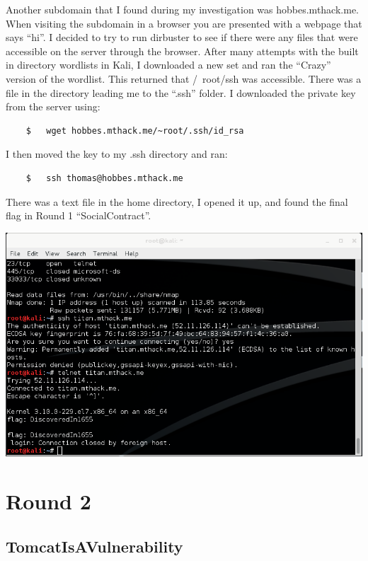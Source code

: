 \documentclass[12pt]{report}
\newcommand{\mychapter}[2]{
    \setcounter{chapter}{#1}
    \setcounter{section}{0}
    \chapter*{#2}
    \addcontentsline{toc}{chapter}{#2}
}
\begin{document}
Another subdomain that I found during my investigation was hobbes.mthack.me. When visiting the subdomain in a browser you are presented with a webpage that says ``hi''. I decided to try to run dirbuster to see if there were any files that were accessible on the server through the browser. After many attempts with the built in directory wordlists in Kali, I downloaded a new set and ran the ``Crazy'' version of the wordlist. This returned that /~root/ssh was accessible. There was a file in the directory leading me to the ``.ssh'' folder. I downloaded the private key from the server using:
	\begin{verbatim}
	$	wget hobbes.mthack.me/~root/.ssh/id_rsa
	\end{verbatim}
I then moved the key to my .ssh directory and ran:
	\begin{verbatim}
	$	ssh thomas@hobbes.mthack.me
	\end{verbatim}
There was a text file in the home directory, I opened it up, and found the final flag in Round 1 ``SocialContract''.\\
\newline
\begin{center}
\includegraphics[scale=0.33]{DiscoveredIn1655.png}
\end{center}


\mychapter{2}{Round 2}
\section{TomcatIsAVulnerability}
\end{document}
